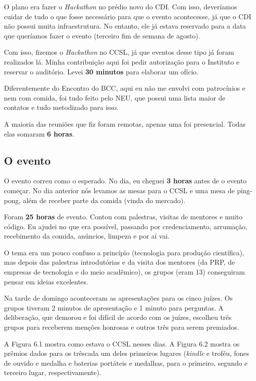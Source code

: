 \documentclass[12pt,letterpaper]{article}
\begin{document}
	O plano era fazer o \textit{Hackathon} no prédio novo do CDI. Com isso, deveríamos cuidar de tudo o que fosse necessário para que o evento acontecesse, já que o CDI não possui muita infraestrutura. No entanto, ele já estava reservado para a data que queríamos fazer o evento (terceiro fim de semana de agosto).
	
	Com isso, fizemos o \textit{Hackathon} no CCSL, já que eventos desse tipo já foram realizados lá. Minha contribuição aqui foi pedir autorização para o Instituto e reservar o auditório. Levei \textbf{30 minutos} para elaborar um ofício. 
	
	Diferentemente do Encontro do BCC, aqui eu não me envolvi com patrocínios e nem com comida, foi tudo feito pelo NEU, que possui uma lista maior de contatos e tudo metodizado para isso.
	
	A maioria das reuniões que fiz foram remotas, apenas uma foi presencial. Todas elas somaram \textbf{6 horas}.
	
	\subsection{O evento}
	O evento correu como o esperado. No dia, eu cheguei \textbf{3 horas} antes de o evento começar. No dia anterior nós levamos as mesas para o CCSL e uma mesa de ping-pong, além de receber parte da comida (vinda do mercado).
	
	Foram \textbf{25 horas} de evento. Contou com palestras, visitas de mentores e muito código. Eu ajudei no que era possível, passando por credenciamento, arrumação, recebimento da comida, anúncios, limpeza e por aí vai.
	
	O tema era um pouco confuso a princípio (tecnologia para produção científica), mas depois das palestras introdutórias e da visita dos mentores (da PRP, de empresas de tecnologia e do meio acadêmico), os grupos (eram 13) conseguiram pensar em ideias excelentes.
	
	Na tarde de domingo aconteceram as apresentações para os cinco juízes. Os grupos tiveram 2 minutos de apresentação e 1 minuto para perguntas. A deliberação, que demorou e foi difícil de acordo com os juízes, escolheu três grupos para receberem menções honrosas e outros três para serem premiados. 
	
	A Figura 6.1 mostra como estava o CCSL nesses dias. A Figura 6.2 mostra os prêmios dados para os trêscada um deles primeiros lugares (\textit{kindle} e troféu, fones de ouvido e medalha e baterias portáteis e medalhas, para o primeiro, segundo e terceiro lugar, respectivamente).
	
\end{document}
